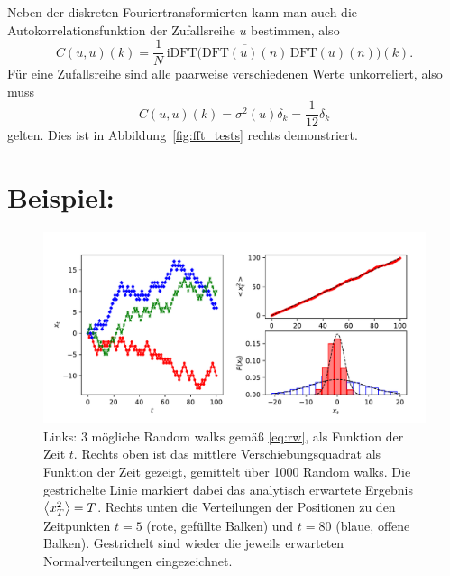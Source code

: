 \subsubsection{}

Neben der diskreten Fouriertransformierten kann man auch die
Autokorrelationsfunktion der Zufallsreihe $u$ bestimmen, also
\begin{equation}
  C(u,u)(k) = \frac{1}{N}\,\text{iDFT}
  \bigl(\overline{\text{DFT}(u)(n)}\,\text{DFT}(u)(n)\bigr)(k).
\end{equation}
Für eine Zufallsreihe sind alle paarweise verschiedenen Werte
unkorreliert, also muss
\begin{equation}
  C(u,u)(k) = \sigma^2(u)\delta_k = \frac{1}{12}\delta_k
\end{equation}
gelten. Dies ist in Abbildung~\ref{fig:fft_tests} rechts
demonstriert.

\section{Beispiel: }
\label{sec:rw}

\begin{figure}
  \centering
  \includegraphics[width=\textwidth]{plots/rw}
  \caption{Links: 3 mögliche Random walks gemäß \eqref{eq:rw}, als
    Funktion der Zeit $t$. Rechts oben ist das mittlere
    Verschiebungsquadrat als Funktion der Zeit gezeigt, gemittelt über
    1000 Random walks. Die gestrichelte Linie markiert dabei das
    analytisch erwartete Ergebnis $\left\langle{x_T^2}\right\rangle=T$. Rechts unten
    die Verteilungen der Positionen zu den Zeitpunkten $t=5$ (rote,
    gefüllte Balken) und $t=80$ (blaue, offene Balken). Gestrichelt sind
    wieder die jeweils erwarteten Normalverteilungen eingezeichnet.}
  \label{fig:rw}
\end{figure}

